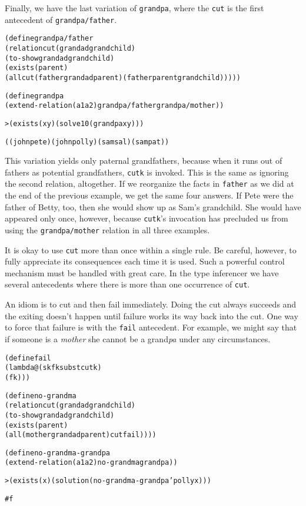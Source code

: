 Finally, we have the last variation of \texttt{grandpa}, where the
\texttt{cut} is the first antecedent of \texttt{grandpa/father}.

\begin{alltt}
(define grandpa/father
  (relation cut (grandad grandchild)
    (to-show grandad grandchild)
    (exists (parent)
      (all cut (father grandad parent) (father parent grandchild)))))
\end{alltt}
\begin{alltt}
(define grandpa
  (extend-relation (a1 a2) grandpa/father grandpa/mother))
\end{alltt}

\begin{alltt}
> (exists (x y) (solve 10 (grandpa x y)))

((john pete) (john polly) (sam sal) (sam pat))
\end{alltt}

\noindent This variation yields only paternal grandfathers, because
when it runs out of fathers as potential grandfathers, \texttt{cutk}
is invoked.  This is the same as ignoring the second relation,
altogether.  If we reorganize the facts in \texttt{father} as we did
at the end of the previous example, we get the same four answers.  If
Pete were the father of Betty, too, then she would show up as Sam's
grandchild.  She would have appeared only once, however, because
\texttt{cutk}'s invocation has precluded us from using the
\texttt{grandpa/mother} relation in all three examples.

It is okay to use \texttt{cut} more than once within a single rule.
Be careful, however, to fully appreciate its consequences each time it
is used.  Such a powerful control mechanism must be handled with great
care.  In the type inferencer we have several antecedents where there
is more than one occurrence of \texttt{cut}.

An idiom is to cut and then fail immediately.  Doing the cut always
succeeds and the exiting doesn't happen until failure works its way
back into the cut.  One way to force that failure is with the
\texttt{fail} antecedent.  For example, we might say that if someone is a
\emph{mother} she cannot be a grand\emph{pa} under any circumstances.

\begin{alltt}
(define fail
  (lambda@ (sk fk subst cutk)
    (fk)))
\end{alltt}

\begin{alltt}
(define no-grandma
  (relation cut (grandad grandchild)
    (to-show grandad grandchild)
    (exists (parent)
      (all (mother grandad parent) cut fail))))

(define no-grandma-grandpa
  (extend-relation (a1 a2) no-grandma grandpa))

> (exists (x) (solution (no-grandma-grandpa 'polly x)))

#f
\end{alltt}        

